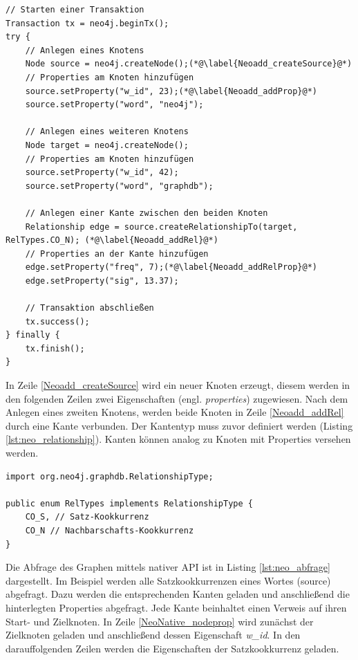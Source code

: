 \documentclass[11pt, a4paper, oneside]{article} %
\begin{document}
\begin{lstlisting}[caption={Einfügen von Knoten und Kanten},label={lst:neo_add}]
// Starten einer Transaktion
Transaction tx = neo4j.beginTx();
try {
	// Anlegen eines Knotens
	Node source = neo4j.createNode();(*@\label{Neoadd_createSource}@*)
	// Properties am Knoten hinzufügen
	source.setProperty("w_id", 23);(*@\label{Neoadd_addProp}@*)
	source.setProperty("word", "neo4j");
	
	// Anlegen eines weiteren Knotens	
	Node target = neo4j.createNode();
	// Properties am Knoten hinzufügen
	source.setProperty("w_id", 42);
	source.setProperty("word", "graphdb");
	
	// Anlegen einer Kante zwischen den beiden Knoten
	Relationship edge = source.createRelationshipTo(target, RelTypes.CO_N); (*@\label{Neoadd_addRel}@*)
	// Properties an der Kante hinzufügen
	edge.setProperty("freq", 7);(*@\label{Neoadd_addRelProp}@*)
	edge.setProperty("sig", 13.37);

	// Transaktion abschließen
	tx.success();
} finally {
	tx.finish();
}
\end{lstlisting}

In Zeile \ref{Neoadd_createSource} wird ein neuer Knoten erzeugt, diesem werden in den folgenden Zeilen zwei Eigenschaften (engl. \textit{properties}) zugewiesen. Nach dem Anlegen eines zweiten Knotens, werden beide Knoten in Zeile \ref{Neoadd_addRel} durch eine Kante verbunden. Der Kantentyp muss zuvor definiert werden (Listing \ref{lst:neo_relationship}). Kanten können analog zu Knoten mit Properties versehen werden.

\begin{lstlisting}[caption={Anlegen von Kantentypen},label={lst:neo_relationship}]
import org.neo4j.graphdb.RelationshipType;

public enum RelTypes implements RelationshipType {
	CO_S, // Satz-Kookkurrenz
	CO_N // Nachbarschafts-Kookkurrenz
}
\end{lstlisting}

Die Abfrage des Graphen mittels nativer API ist in Listing \ref{lst:neo_abfrage} dargestellt. Im Beispiel werden alle Satzkookkurrenzen eines Wortes (source) abgefragt. Dazu werden die entsprechenden Kanten geladen und anschließend die hinterlegten Properties abgefragt. Jede Kante beinhaltet einen Verweis auf ihren Start- und Zielknoten. In Zeile \ref{NeoNative_nodeprop} wird zunächst der Zielknoten geladen und anschließend dessen Eigenschaft \textit{w\_id}. In den darauffolgenden Zeilen werden die Eigenschaften der Satzkookkurrenz geladen.
\end{document}
